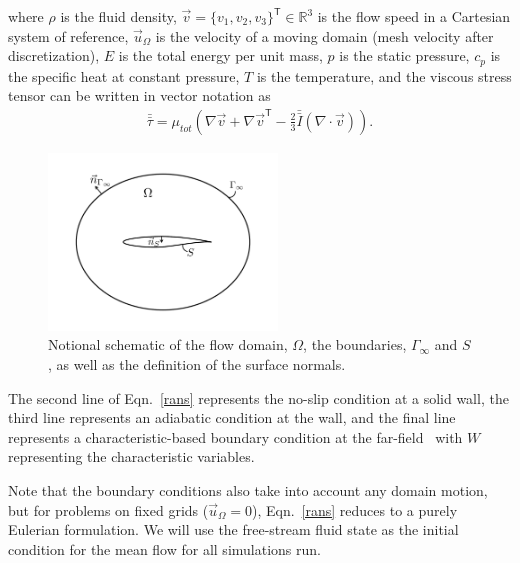 where $\rho$ is the fluid density, $\vec{v} = \{v_1, v_2, v_3\}^\mathsf{T} \in \mathbb{R}^{3}$ is the flow speed in a Cartesian system of reference, $\vec{u}_\Omega$ is the velocity of a moving domain (mesh velocity after discretization), $E$ is the total energy per unit mass, $p$ is the static pressure, $c_p$ is the specific heat at constant pressure, $T$ is the temperature, and the viscous stress tensor can be written in vector notation as
\begin{align} \label{tau}
\bar{\bar{\tau}} = \mu _{tot} \left(\nabla \vec{v} + {\nabla \vec{v}}^\mathsf{T}  - \frac{2}{3} \bar{\bar{I}} (\nabla \cdot \vec{v} )\right).
\end{align}
\begin{figure}
  \begin{center}
   \includegraphics[width=2.4in]{domain.pdf}
    \caption{Notional schematic of the flow domain, $\Omega$, the boundaries, $\Gamma_\infty$ and $S$, as well as the definition of the surface normals.}
    \label{domain}
  \end{center}
\end{figure}
The second line of Eqn.~\ref{rans} represents the no-slip condition at a solid wall, the third line represents an adiabatic condition at the wall, and the final line represents a characteristic-based boundary condition at the far-field~\cite{hirsch1984} with $W$ representing the characteristic variables. 

Note that the boundary conditions also take into account any domain motion, but for problems on fixed grids ($\vec{u}_\Omega = 0$), Eqn.~\ref{rans} reduces to a purely Eulerian formulation.  We will use the free-stream fluid state as the initial condition for the mean flow for all simulations run.

